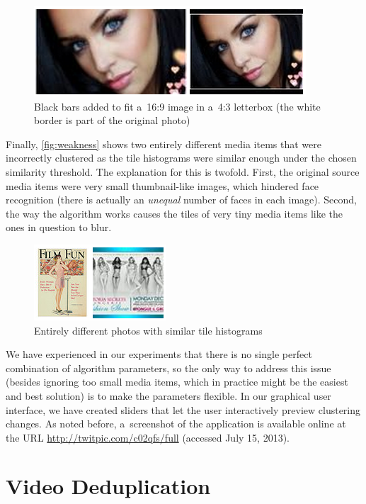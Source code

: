 \begin{figure}[!ht]
  \centering
  \includegraphics[width=0.55\linewidth]{./bwtolerance.png}
  \caption[Black bars added to fit a~16:9 image in a~4:3 letterbox]
    {Black bars added to fit a~16:9 image in a~4:3 letterbox
    (the white border is part of the original photo)}
  \label{fig:bwtolerance}
\end{figure}

Finally, \autoref{fig:weakness} shows two entirely different media items
that were incorrectly clustered as the tile histograms
were similar enough under the chosen similarity threshold.
The explanation for this is twofold.
First, the original source media items were very small thumbnail-like images,
which hindered face recognition
(there is actually an \emph{unequal} number of faces in each image).
Second, the way the algorithm works
causes the tiles of very tiny media items like the ones in question to blur.

\begin{figure}[!ht]
  \centering
  \includegraphics[width=0.4\linewidth]{./weakness.png}
  \caption{Entirely different photos with similar tile histograms}
  \label{fig:weakness}
\end{figure}

We have experienced in our experiments that there is no single perfect
combination of algorithm parameters,
so the only way to address this issue (besides ignoring too small media items,
which in practice might be the easiest and best solution)
is to make the parameters flexible.
In our graphical user interface, we have created sliders
that let the user interactively preview clustering changes.
As noted before, a~screenshot of the application
is available online at the URL \url{http://twitpic.com/c02qfs/full} (accessed July 15, 2013).

\section{Video Deduplication}

